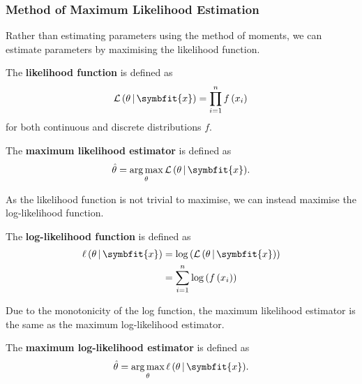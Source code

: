 \documentclass{article}
\DeclareMathOperator*{\argmax}{arg\,max}
\begin{document}
\subsubsection{Method of Maximum Likelihood Estimation}
Rather than estimating parameters using the method of moments,
we can estimate parameters by maximising the likelihood function.
\begin{definition}
    The \textbf{likelihood function} is defined as
    \begin{equation*}
        \mathcal{L}\left( \theta \,\vert\, \symbfit{x} \right) = \prod_{i = 1}^n f\left( x_i \right) \\
    \end{equation*}
    for both continuous and discrete distributions \(f\).
\end{definition}
\begin{definition}
    The \textbf{maximum likelihood estimator} is defined as
    \begin{equation*}
        \hat{\theta} = \argmax_\theta{\mathcal{L}\left( \theta \,\vert\, \symbfit{x} \right)}.
    \end{equation*}
\end{definition}
As the likelihood function is not trivial to maximise, we can instead maximise the log-likelihood function.
\begin{definition}
    The \textbf{log-likelihood function} is defined as
    \begin{align*}
        \ell\left( \theta \,\vert\, \symbfit{x} \right) & = \log{\left( \mathcal{L}\left( \theta \,\vert\, \symbfit{x} \right) \right)} \\
                                                        & = \sum_{i = 1}^n \log{\left( f\left( x_i \right) \right)}
    \end{align*}
\end{definition}
Due to the monotonicity of the log function, the maximum likelihood estimator is the same as the maximum log-likelihood estimator.
\begin{definition}
    The \textbf{maximum log-likelihood estimator} is defined as
    \begin{equation*}
        \hat{\theta} = \argmax_\theta{\ell\left( \theta \,\vert\, \symbfit{x} \right)}.
    \end{equation*}
\end{definition}
\end{document}
